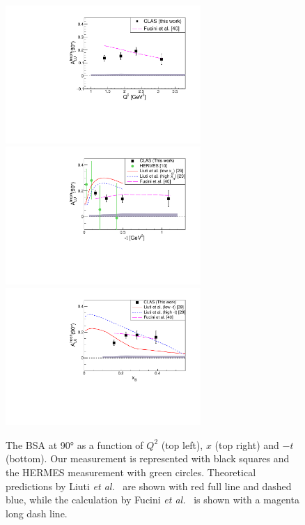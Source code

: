 \documentclass{article}
\begin{document}
\begin{figure}[tbp!]
\center
\includegraphics[width=7.4cm]{fig3/ALU_90_p_vs_Q2_shortscenrario.pdf}
\includegraphics[width=7.4cm]{fig3/ALU_90_p_vs_t_shortscenrario.pdf}
\includegraphics[width=7.4cm]{fig3/ALU_90_p_vs_x_shortscenrario.pdf}
	\caption{The BSA at 90° as a function of  $Q^2$ (top left), $x$ (top right) and 
	$-t$ (bottom). Our measurement is represented with black squares and the HERMES 
	measurement \cite{Airapetian:2009cga} with green circles. Theoretical predictions 
	by Liuti {\it et al.}~\cite{Liuti:2005gi,GonzalezHernandez:2012jv} are shown 
	with red full line and dashed blue, while the calculation by Fucini 
	{\it et al.}~\cite{Fucini:2019xlc} is shown with a magenta long dash line.}
\label{fig:IncALU}
\end{figure}
\end{document}

